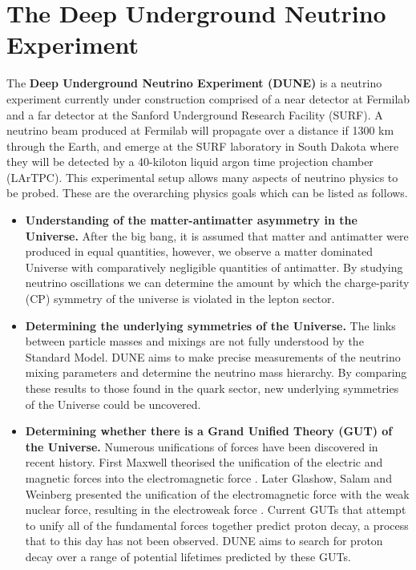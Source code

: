 \section{The Deep Underground Neutrino Experiment}
The \textbf{Deep Underground Neutrino Experiment (DUNE)} is a neutrino experiment currently under construction comprised of a near detector at Fermilab and a far detector at the Sanford Underground Research Facility (SURF).
A neutrino beam produced at Fermilab will propagate over a distance if 1300 km through the Earth, and emerge at the SURF laboratory in South Dakota where they will be detected by a 40-kiloton liquid argon time projection chamber (LArTPC).
This experimental setup allows many aspects of neutrino physics to be probed.
These are the overarching physics goals which can be listed as follows.

\begin{itemize}
\item \textbf{Understanding of the matter-antimatter asymmetry in the Universe.} After the big bang, it is assumed that matter and antimatter were produced in equal quantities, however, we observe a matter dominated Universe with comparatively negligible quantities of antimatter. By studying neutrino oscillations we can determine the amount by which the charge-parity (CP) symmetry of the universe is violated in the lepton sector. 

\item \textbf{Determining the underlying symmetries of the Universe.} The links between particle masses and mixings are not fully understood by the Standard Model. DUNE aims to make precise measurements of the neutrino mixing parameters and determine the neutrino mass hierarchy. By comparing these results to those found in the quark sector, new underlying symmetries of the Universe could be uncovered.

\item \textbf{Determining whether there is a Grand Unified Theory (GUT) of the Universe.} Numerous unifications of forces have been discovered in recent history. First Maxwell theorised the unification of the electric and magnetic forces into the electromagnetic force \cite{maxwell1873treatise}. Later Glashow, Salam and Weinberg presented the unification of the electromagnetic force with the weak nuclear force, resulting in the electroweak force \cite{glashow1959renormalizability, salam1959weak, weinberg1967model}. Current GUTs that attempt to unify all of the fundamental forces together predict proton decay, a process that to this day has not been observed. DUNE aims to search for proton decay over a range of potential lifetimes predicted by these GUTs.


\end{itemize}
